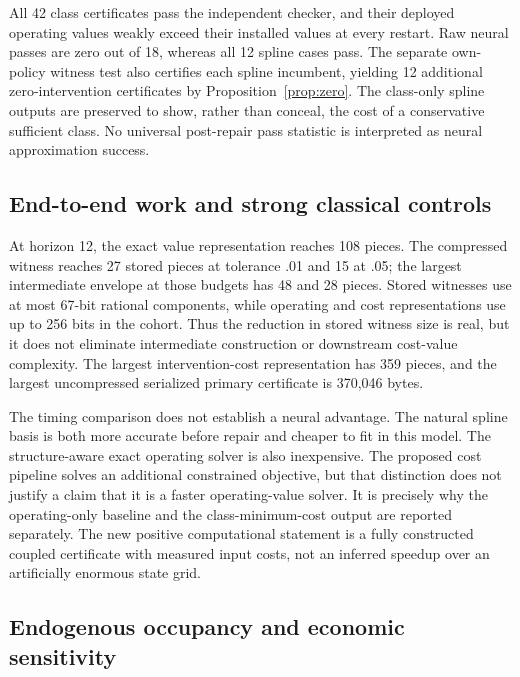 

All 42 class certificates pass the independent checker, and their deployed operating values weakly exceed their installed values at every restart. Raw neural passes are zero out of 18, whereas all 12 spline cases pass. The separate own-policy witness test also certifies each spline incumbent, yielding 12 additional zero-intervention certificates by Proposition~\ref{prop:zero}. The class-only spline outputs are preserved to show, rather than conceal, the cost of a conservative sufficient class. No universal post-repair pass statistic is interpreted as neural approximation success.

\subsection{End-to-end work and strong classical controls}



At horizon 12, the exact value representation reaches 108 pieces. The compressed witness reaches 27 stored pieces at tolerance .01 and 15 at .05; the largest intermediate envelope at those budgets has 48 and 28 pieces. Stored witnesses use at most 67-bit rational components, while operating and cost representations use up to 256 bits in the cohort. Thus the reduction in stored witness size is real, but it does not eliminate intermediate construction or downstream cost-value complexity. The largest intervention-cost representation has 359 pieces, and the largest uncompressed serialized primary certificate is 370,046 bytes.

The timing comparison does not establish a neural advantage. The natural spline basis is both more accurate before repair and cheaper to fit in this model. The structure-aware exact operating solver is also inexpensive. The proposed cost pipeline solves an additional constrained objective, but that distinction does not justify a claim that it is a faster operating-value solver. It is precisely why the operating-only baseline and the class-minimum-cost output are reported separately. The new positive computational statement is a fully constructed coupled certificate with measured input costs, not an inferred speedup over an artificially enormous state grid.

\subsection{Endogenous occupancy and economic sensitivity}


